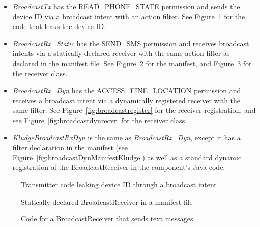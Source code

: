 \begin{itemize}
\item{} \emph{BroadcastTx} has the READ\_PHONE\_STATE permission and sends the device ID via a broadcast intent with an action filter. See Figure~\ref{fig:broadcastleak} for the code that leaks the device ID.

\item{} \emph{BroadcastRx\_Static} has the SEND\_SMS permission and receives broadcast intents via a statically declared receiver with the same action filter as declared in the manifest file.  See Figure~\ref{fig:broadcastmanifest} for the manifest, and Figure~\ref{fig:broadcaststaticrecvr} for the receiver class.

\item{} \emph{BroadcastRx\_Dyn} has the ACCESS\_FINE\_LOCATION permission and receives a broadcast intent via a dynamically registered receiver with the same filter.  See Figure~\ref{fig:broadcastregister} for the receiver registration, and see Figure~\ref{fig:broadcastdynrecvr} for the receiver class. 

\item{} \emph{KludgeBroadcastRxDyn} is the same as \emph{BroadcastRx\_Dyn}, except it has a filter declaration in the manifest (see Figure~\ref{fig:broadcastDynManifestKludge}) as well as a standard dynamic registration of the BroadcastReceiver in the component’s Java code. 
\end{itemize} 


\begin{figure}[!h]
\begin{framed}

\caption{Transmitter code leaking device ID through a broadcast intent}
\label{fig:broadcastleak}
\end{framed}
\end{figure}

\begin{figure}[!h]
\begin{framed}

\caption{Statically declared BroadcastReceiver in a manifest file}
\label{fig:broadcastmanifest}
\end{framed}
\end{figure}

\begin{figure}[!h]
\begin{framed}

\caption{Code for a BroadcastReceiver that sends text messages}
\label{fig:broadcaststaticrecvr}
\end{framed}
\end{figure}

